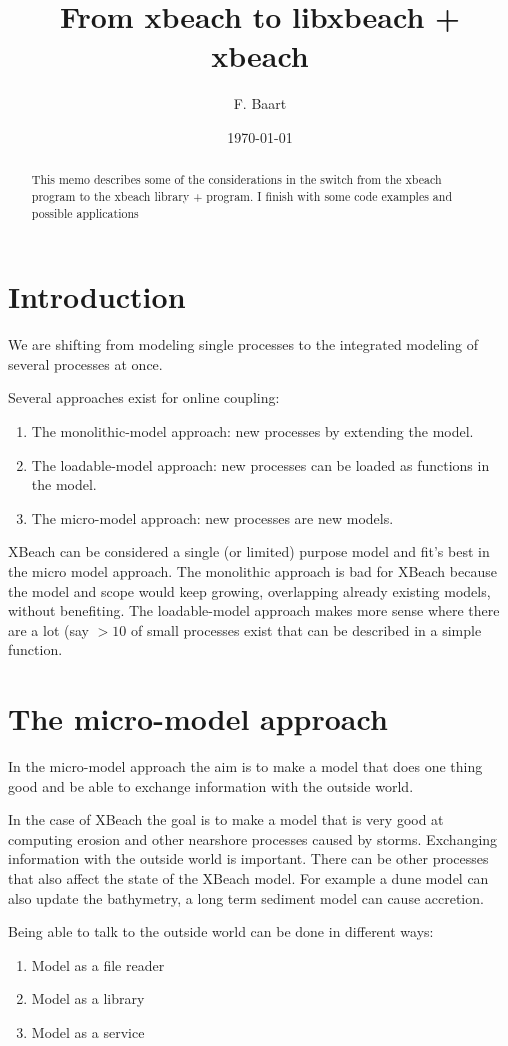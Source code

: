 \documentclass{article}
\date{\today}
\title{From xbeach to libxbeach + xbeach}
\author{
F. Baart
}
\begin{document}
\maketitle
\begin{abstract}
  This memo describes some of the considerations in the switch from the xbeach program to the xbeach library + program. 
  I finish with some code examples and possible applications 
\end{abstract}
\section{Introduction}
We are shifting from modeling single processes to the integrated modeling of several processes at once. 

Several approaches exist for online coupling: 
\begin{enumerate}
\item The monolithic-model approach: new processes by extending the model.
\item The loadable-model approach: new processes can be loaded as functions in the model. 
\item The micro-model approach: new processes are new models. 
\end{enumerate}

XBeach can be considered a single (or limited) purpose model and fit's best in the micro model approach. The monolithic approach is bad for XBeach because the model and scope would keep growing, overlapping already existing models, without benefiting. The loadable-model approach makes more sense where there are a lot (say $>10$ of small processes exist that can be described in a simple function. 

\section{The micro-model approach}
In the micro-model approach the aim is to make a model that does one thing good and be able to exchange information with the outside world. 

In the case of XBeach the goal is to make a model that is very good at computing erosion and other nearshore processes caused by storms. 
Exchanging information with the outside world is important. There can be other processes that also affect the state of the XBeach model. For example a dune model can also update the bathymetry, a long term sediment model can cause accretion. 

Being able to talk to the outside world can be done in different ways:
\begin{enumerate}
\item Model as a file reader
\item Model as a library
\item Model as a service
\end{enumerate}
\end{document}
